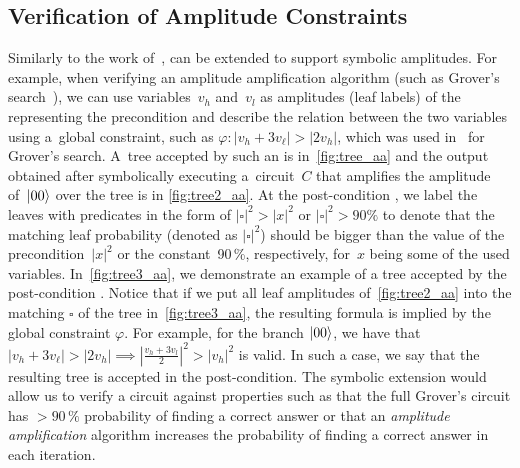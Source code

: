 %


\vspace{-0.0mm}
\subsection{Verification of Amplitude Constraints}\label{sec:amplitude}
\vspace{-0.0mm}
\figAmplitude


Similarly to the work of~\cite{ChenCLLT23}, \lstas can be extended to
support symbolic amplitudes.
For example, when verifying an amplitude amplification algorithm (such as
Grover's search~\cite{Grover96}), we can use variables~$v_h$ and~$v_l$ as
amplitudes (leaf labels) of the \lsta representing the
precondition and describe the relation between the two variables using a~global
constraint, such as
$\varphi\colon|v_h+3v_\ell|>|2v_h|$, which was used in~\cite{ChenCLLT23} for
Grover's search.
A~tree accepted by such an \lsta is in~\cref{fig:tree_aa}
and the output obtained after symbolically executing a~circuit~$C$
that amplifies the amplitude of~$\ket{00}$ over the tree is in
\cref{fig:tree2_aa}.
At the post-condition \lsta, we label the leaves with predicates in the form of
$|\square|^2 > |x|^2$ or $|\square|^2 > 90\%$ to denote that the matching leaf
probability (denoted as $|\square|^2$) should be bigger than the value of the
precondition~$|x|^2$ or the constant~90\,\%, respectively, for~$x$ being some of
the used variables.
In~\cref{fig:tree3_aa}, we demonstrate an example of a tree accepted by the
post-condition \lsta.
Notice that if we put all leaf amplitudes of~\cref{fig:tree2_aa} into the
matching $\square$ of the tree in~\cref{fig:tree3_aa}, the resulting formula is
implied by the global constraint $\varphi$.
For example, for the branch $\ket{00}$, we have that $|v_h+3v_\ell|>|2v_h|
\implies |\frac{v_h+3v_l}{2}|^2 > |v_h|^2$ is valid.
In such a case, we say that the resulting tree is accepted in the post-condition.
The symbolic extension would allow us to verify a circuit against properties
such as that the full Grover's circuit has ${>}90\,\%$ probability of finding a
correct answer or that an \emph{amplitude amplification} algorithm increases the
probability of finding a correct answer in each iteration. 

